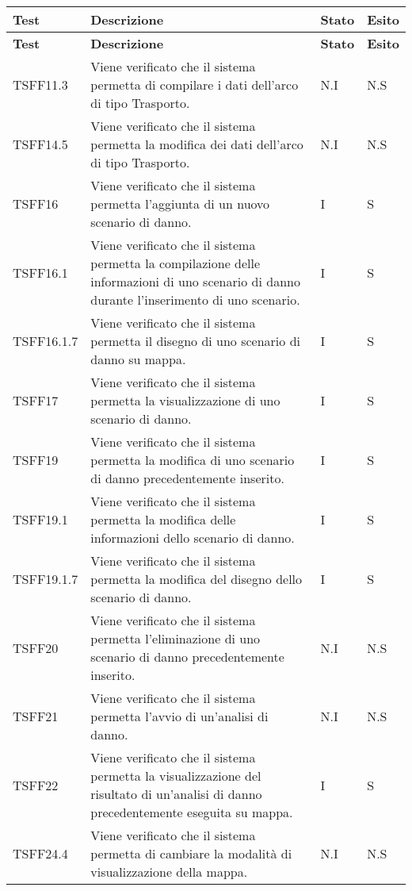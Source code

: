 		\def\arraystretch{1.5}
		\begin{longtable}{p{1.5cm}!{\VRule[1pt]}p{5cm}!{\VRule[1pt]}p{1cm}!{\VRule[1pt]}p{1cm}}
			\color{white} \textbf{Test} & \color{white} \textbf{Descrizione} & \color{white} \textbf{Stato} & \color{white} \textbf{Esito} \\ 
			\endfirsthead 
			\color{white} \textbf{Test} & \color{white} \textbf{Descrizione} & \color{white} \textbf{Stato} & \color{white} \textbf{Esito} \\ 
			\endhead 
			TSFF11.3 & Viene verificato che il sistema permetta di compilare i dati dell'arco di tipo Trasporto. & N.I & N.S \\ 
			TSFF14.5 & Viene verificato che il sistema permetta la modifica dei dati dell'arco di tipo Trasporto. & N.I & N.S \\ 
			TSFF16 & Viene verificato che il sistema permetta l'aggiunta di un nuovo scenario di danno. & I & S \\ 
			TSFF16.1 & Viene verificato che il sistema permetta la compilazione delle informazioni di uno scenario di danno durante l'inserimento di uno scenario. & I & S \\ 
			TSFF16.1.7 & Viene verificato che il sistema permetta il disegno di uno scenario di danno su mappa. & I & S \\ 
			TSFF17 & Viene verificato che il sistema permetta la visualizzazione di uno scenario di danno. & I & S \\ 
			TSFF19 & Viene verificato che il sistema permetta la modifica di uno scenario di danno precedentemente inserito. & I & S \\ 
			TSFF19.1 & Viene verificato che il sistema permetta la modifica delle informazioni dello scenario di danno. & I & S \\ 
			TSFF19.1.7 & Viene verificato che il sistema permetta la modifica del disegno dello scenario di danno. & I & S \\ 
			TSFF20 & Viene verificato che il sistema permetta l'eliminazione di uno scenario di danno precedentemente inserito. & N.I & N.S \\ 
			TSFF21 & Viene verificato che il sistema permetta l'avvio di un'analisi di danno. & N.I & N.S \\ 
			TSFF22 & Viene verificato che il sistema permetta la visualizzazione del risultato di un'analisi di danno precedentemente eseguita su mappa. & I & S \\ 
			TSFF24.4 & Viene verificato che il sistema permetta di cambiare la modalità di visualizzazione della mappa. & N.I & N.S \\ 

\end{longtable}
